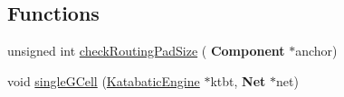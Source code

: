 \subsection*{Functions}
\begin{DoxyCompactItemize}
\item 
unsigned int \mbox{\hyperlink{group__LoadGlobalRouting_gaad5d32b07d1d53ecc8642e4b10df9605}{check\+Routing\+Pad\+Size}} (\textbf{ Component} $\ast$anchor)
\item 
void \mbox{\hyperlink{group__LoadGlobalRouting_ga3973291866b39c10cea5ca17f7d174fb}{single\+G\+Cell}} (\mbox{\hyperlink{classKatabatic_1_1KatabaticEngine}{Katabatic\+Engine}} $\ast$ktbt, \textbf{ Net} $\ast$net)
\end{DoxyCompactItemize}
